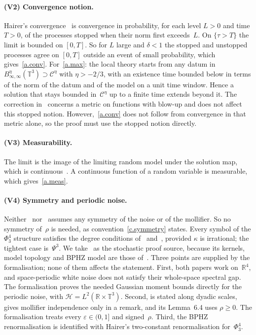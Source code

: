 \documentclass[11pt,letterpaper]{article}
\numberwithin{equation}{section}
\theoremstyle{plain}
\theoremstyle{definition}
\theoremstyle{remark}
\newcommand{\R}{\mathbb{R}}
\newcommand{\T}{\mathbb{T}^3}
\newcommand{\Hil}{\mathcal{H}}
\newcommand{\Cs}{\mathcal{C}}
\newcommand{\nf}[2]{#1/#2}
\newcommand{\1}{\mathbf{1}}
\begin{document}
\paragraph{(V2) Convergence notion.} Hairer's convergence~\cite[Remarks~1.13 and~1.16]{Hai14} is convergence in probability, for each level $L>0$ and time $T>0$, of the processes stopped when their norm first exceeds~$L$. On $\{\tau>T\}$ the limit is bounded on $[0,T]$. So for $L$ large and $\delta<1$ the stopped and unstopped processes agree on $[0,T]$ outside an event of small probability, which gives~\ref{a.conv}. For~\ref{a.max}: the local theory starts from any datum in $B^\eta_{\infty,\infty}(\T)\supset\Cs^\eta$ with $\eta>-\nf{2}{3}$, with an existence time bounded below in terms of the norm of the datum and of the model on a unit time window. Hence a solution that stays bounded in~$\Cs^\eta$ up to a finite time extends beyond it. The correction in~\cite[Remark~2.20]{BCCH21} concerns a metric on functions with blow-up and does not affect this stopped notion. However,~\ref{a.conv} does not follow from convergence in that metric alone, so the proof must use the stopped notion directly.

\paragraph{(V3) Measurability.} The limit is the image of the limiting random model under the solution map, which is continuous~\cite[Proposition~9.8]{Hai14}. A continuous function of a random variable is measurable, which gives~\ref{a.meas}.

\paragraph{(V4) Symmetry and periodic noise.} Neither~\cite{HS23} nor~\cite{BH26} assumes any symmetry of the noise or of the mollifier. So no symmetry of~$\rho$ is needed, as convention~\ref{c.symmetry} states. Every symbol of the $\Phi^4_3$ structure satisfies the degree conditions of~\cite[Assumption~2.31]{HS23} and~\cite[Theorem~19]{BH26}, provided $\kappa$ is irrational; the tightest case is~$\Psi^3$. We take~\cite{HS23} as the stochastic proof source, because its kernels, model topology and BPHZ model are those of~\cite[Theorem~10.22]{Hai14}. Three points are supplied by the formalisation; none of them affects the statement. First, both papers work on~$\R^4$, and space-periodic white noise does not satisfy their whole-space spectral gap. The formalisation proves the needed Gaussian moment bounds directly for the periodic noise, with $\Hil=L^2(\R\times\T)$. Second, \cite[Theorem~2.33]{HS23} is stated along dyadic scales, gives mollifier independence only in a remark, and its Lemma~6.4 uses $\rho\ge0$. The formalisation treats every $\varepsilon\in(0,1]$ and signed~$\rho$. Third, the BPHZ renormalisation is identified with Hairer's two-constant renormalisation for~$\Phi^4_3$.
\end{document}

